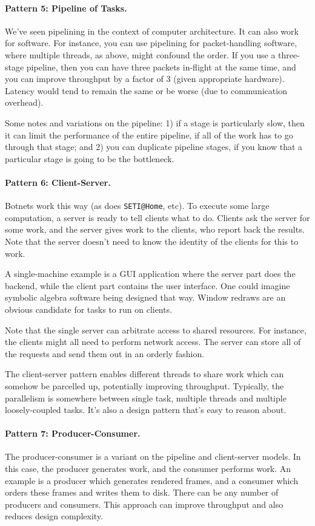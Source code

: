 \paragraph{Pattern 5: Pipeline of Tasks.} We've seen pipelining in the context of
computer architecture. It can also work for software. For instance,
you can use pipelining for packet-handling software, where multiple
threads, as above, might confound the order. If you use a three-stage
pipeline, then you can have three packets in-flight at the same time,
and you can improve throughput by a factor of 3 (given appropriate
hardware).  Latency would tend to remain the same or be worse (due to
communication overhead).

Some notes and variations on the pipeline: 1) if a stage is
particularly slow, then it can limit the performance of the entire
pipeline, if all of the work has to go through that stage; and 2) you
can duplicate pipeline stages, if you know that a particular stage is
going to be the bottleneck.

\paragraph{Pattern 6: Client-Server.} Botnets work this way (as does \verb+SETI@Home+,
etc). To execute some large computation, a server is ready to tell
clients what to do.  Clients ask the server for some work, and the
server gives work to the clients, who report back the results. Note
that the server doesn't need to know the identity of the clients for
this to work.

A single-machine example is a GUI application where the server part
does the backend, while the client part contains the user interface.
One could imagine symbolic algebra software being designed that way.
Window redraws are an obvious candidate for tasks to run on clients.

Note that the single server can arbitrate access to shared resources.
For instance, the clients might all need to perform network access.
The server can store all of the requests and send them out in an
orderly fashion.

The client-server pattern enables different threads to share work
which can somehow be parcelled up, potentially improving
throughput. Typically, the parallelism is somewhere between single
task, multiple threads and multiple loosely-coupled tasks. It's also a
design pattern that's easy to reason about.

\paragraph{Pattern 7: Producer-Consumer.} The producer-consumer is 
a variant on the pipeline and client-server models. In this case, the
producer generates work, and the consumer performs work. An example is
a producer which generates rendered frames, and a consumer which
orders these frames and writes them to disk. There can be any number
of producers and consumers. This approach can improve throughput
and also reduces design complexity.

